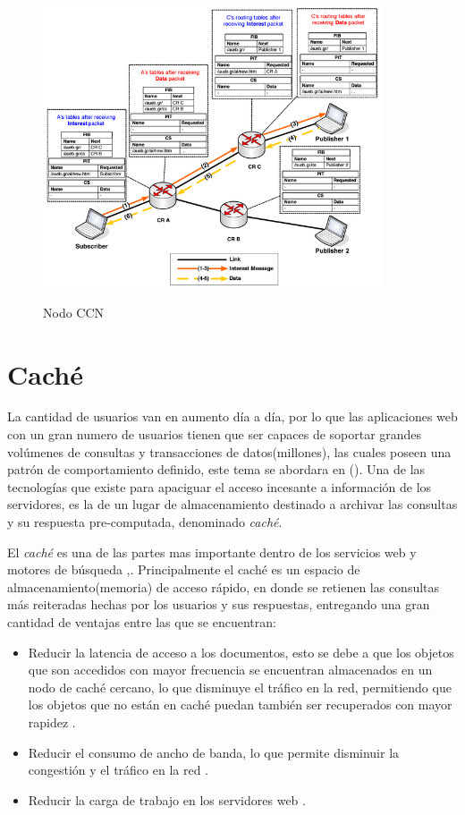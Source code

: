 \documentclass[12pt]{ociamthesis}  %
\begin{document}
	\begin{figure}[!htb]
		\centering
		\includegraphics[width=10cm]{Nodo2.png}\\
		\caption{Nodo CCN}
		\label{fig:mesh1}
	\end{figure}


\section{Caché}
La cantidad de usuarios van en aumento día a día, por lo que las aplicaciones web con un gran numero de usuarios tienen que ser capaces de soportar grandes volúmenes de consultas y transacciones de datos(millones), las cuales poseen una patrón de comportamiento definido, este tema se abordara en (). Una de las tecnologías que existe para apaciguar el acceso incesante a información de los servidores, es la de un lugar de almacenamiento destinado a archivar las consultas y su respuesta pre-computada, denominado \textit{caché}.

El \textit{caché} es una de las partes mas importante dentro de los servicios web y motores de búsqueda \cite{altingovde2009cost},\cite{aggarwal1999caching}. Principalmente el caché es un espacio de almacenamiento(memoria) de acceso rápido, en donde se retienen las consultas más reiteradas hechas por los usuarios y sus respuestas, entregando una gran cantidad de ventajas entre las que se encuentran:

\begin{itemize}
	
	\item Reducir la latencia de acceso a los documentos, esto se debe a que los objetos que son accedidos con mayor frecuencia se encuentran almacenados en un nodo de caché cercano, lo que disminuye el tráfico en la red, permitiendo que los objetos que no están en caché puedan también ser recuperados con mayor rapidez \cite{wang1999survey}.
	
	\item Reducir el consumo de ancho de banda, lo que permite disminuir la congestión y el tráfico en la red \cite{wang1999survey}.
	
	\item Reducir la carga de trabajo en los servidores web \cite{wang1999survey}.
	
\end{itemize}
\end{document}
